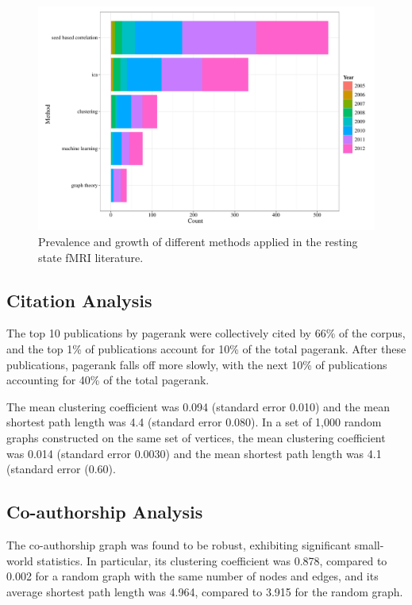 \documentclass[5p]{elsarticle}
\begin{document}
\begin{figure}
  \begin{center}
    \includegraphics[width=\linewidth]{figures/methods_growth_hist}%
    \caption{Prevalence and growth of different methods applied in the resting
    state fMRI literature. 
        \label{fig:methods_growth_hist}
    }
  \end{center}
\end{figure}

\subsection{Citation Analysis} 
The top 10 publications by pagerank were collectively cited by 66\% of the
corpus, and the top 1\% of publications account for 10\% of the total pagerank.
After these publications, pagerank falls off more slowly, with the next 10\% of
publications accounting for 40\% of the total pagerank. 

The mean clustering coefficient was 0.094 (standard error 0.010) and the mean
shortest path length was 4.4 (standard error 0.080). In a set of 1,000 random
graphs constructed on the same set of vertices, the mean clustering coefficient
was 0.014 (standard error 0.0030) and the mean shortest path length was 4.1
(standard error (0.60).

\subsection{Co-authorship Analysis}
The co-authorship graph was found to be robust, exhibiting significant
small-world statistics. In particular, its clustering coefficient was 0.878,
compared to 0.002 for a random graph with the same number of nodes and edges,
and its average shortest path length was 4.964, compared to 3.915 for the random
graph.
\end{document}
